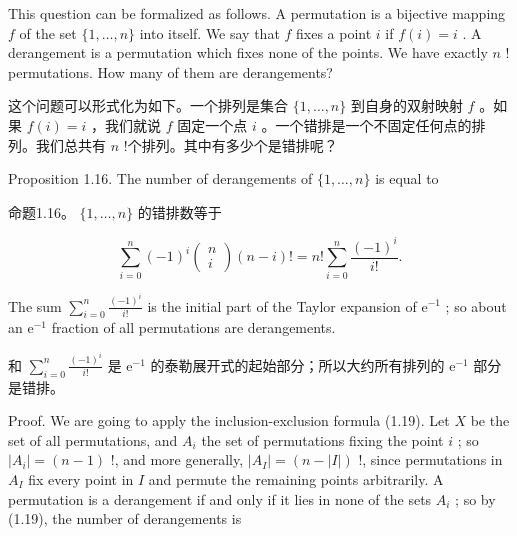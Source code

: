 \documentclass[10pt]{article}
\begin{document}
This question can be formalized as follows. A permutation is a bijective mapping \(f\) of the set \(\{ 1,\ldots ,n\}\) into itself. We say that \(f\) fixes a point \(i\) if \(f\left( i\right)  = i\) . A derangement is a permutation which fixes none of the points. We have exactly \(n\) ! permutations. How many of them are derangements?

\begin{tcolorbox}\relax
这个问题可以形式化为如下。一个排列是集合 \(\{ 1,\ldots ,n\}\) 到自身的双射映射 \(f\) 。如果 \(f\left( i\right)  = i\) ，我们就说 \(f\) 固定一个点 \(i\) 。一个错排是一个不固定任何点的排列。我们总共有 \(n\) !个排列。其中有多少个是错排呢？
\end{tcolorbox}

Proposition 1.16. The number of derangements of \(\{ 1,\ldots ,n\}\) is equal to

\begin{tcolorbox}\relax
命题1.16。 \(\{ 1,\ldots ,n\}\) 的错排数等于
\end{tcolorbox}

\[
\mathop{\sum }\limits_{{i = 0}}^{n}{\left( -1\right) }^{i}\left( \begin{matrix} n \\  i \end{matrix}\right) \left( {n - i}\right) ! = n!\mathop{\sum }\limits_{{i = 0}}^{n}\frac{{\left( -1\right) }^{i}}{i!}. \tag{1.22}
\]

The sum \(\mathop{\sum }\limits_{{i = 0}}^{n}\frac{{\left( -1\right) }^{i}}{i!}\) is the initial part of the Taylor expansion of \({\mathrm{e}}^{-1}\) ; so about an \({\mathrm{e}}^{-1}\) fraction of all permutations are derangements.

\begin{tcolorbox}\relax
和 \(\mathop{\sum }\limits_{{i = 0}}^{n}\frac{{\left( -1\right) }^{i}}{i!}\) 是 \({\mathrm{e}}^{-1}\) 的泰勒展开式的起始部分；所以大约所有排列的 \({\mathrm{e}}^{-1}\) 部分是错排。
\end{tcolorbox}

Proof. We are going to apply the inclusion-exclusion formula (1.19). Let \(X\) be the set of all permutations, and \({A}_{i}\) the set of permutations fixing the point \(i\) ; so \(\left| {A}_{i}\right|  = \left( {n - 1}\right)\) !, and more generally, \(\left| {A}_{I}\right|  = \left( {n - \left| I\right| }\right)\) !, since permutations in \({A}_{I}\) fix every point in \(I\) and permute the remaining points arbitrarily. A permutation is a derangement if and only if it lies in none of the sets \({A}_{i}\) ; so by (1.19), the number of derangements is
\end{document}
